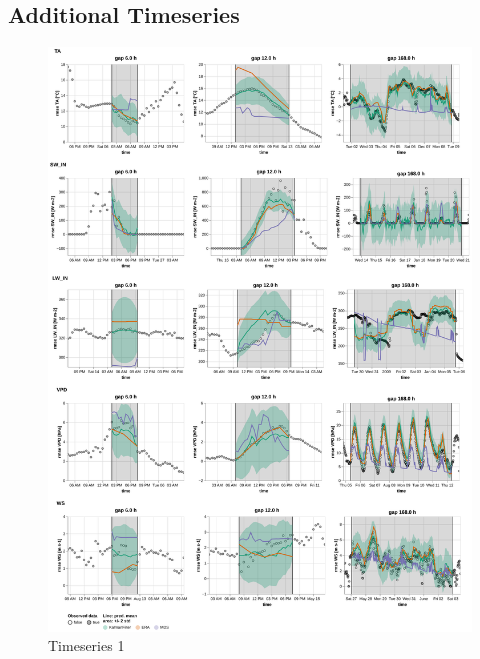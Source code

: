 \documentclass{article}
\newcommand{\imgwidth}{6in}
\let\Oldsubsection\subsection
\renewcommand{\subsection}{\FloatBarrier\Oldsubsection}
\begin{document}
\subsection{Additional Timeseries}

\begin{figure}
\centerline{\includegraphics[width=\imgwidth]{timeseries_1_1}}
\caption{Timeseries 1}
\label{fig:ts_1_1}
\end{figure}
\end{document}
